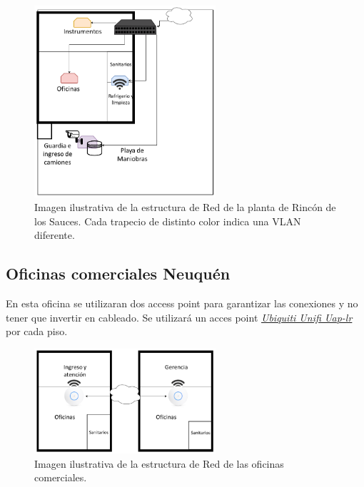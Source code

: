 \documentclass[11pt]{article}
\begin{document}
    \begin{figure}[H]
        \centering
        \includegraphics[width=0.6\textwidth]{Figure/Parque_Industrial.png}
        \caption{Imagen ilustrativa de la estructura de Red de la planta de Rincón de los Sauces. Cada trapecio de distinto color indica una VLAN diferente.}
    \end{figure}

    \subsection{Oficinas comerciales Neuquén}

    En esta oficina se utilizaran dos access point para garantizar las conexiones y no tener que invertir en cableado. Se utilizará un acces point 
    \href{https://www.mercadolibre.com.ar/access-point-interior-ubiquiti-networks-unifi-ac-lr-ap-uap-ac-lr-blanco-1-unidad/p/MLA7953376?pdp_filters=category:MLA1700#searchVariation=MLA7953376&position=1&type=product&tracking_id=933ff74a-93c5-4a58-9a31-9fe5a3c5746e}{\textit{Ubiquiti Unifi Uap-lr}}
    por cada piso.

    \begin{figure}[H]
        \centering
        \includegraphics[width=0.6\textwidth]{Figure/Centrales_Neuquen.png}
        \caption{Imagen ilustrativa de la estructura de Red de las oficinas comerciales.}
    \end{figure}
\end{document}
